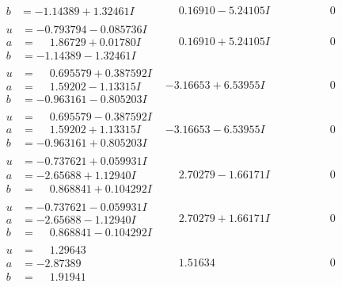 \documentclass[1p]{elsarticle_modified}
\theoremstyle{definition}
\begin{document}
$$\begin{array}{c|c|c}
\begin{aligned}
b &= -1.14389 + 1.32461 I\end{aligned}
 & \phantom{-}0.16910 - 5.24105 I & \phantom{-0.000000 } 0 \\ \hline\begin{aligned}
u &= -0.793794 - 0.085736 I \\
a &= \phantom{-}1.86729 + 0.01780 I \\
b &= -1.14389 - 1.32461 I\end{aligned}
 & \phantom{-}0.16910 + 5.24105 I & \phantom{-0.000000 } 0 \\ \hline\begin{aligned}
u &= \phantom{-}0.695579 + 0.387592 I \\
a &= \phantom{-}1.59202 - 1.13315 I \\
b &= -0.963161 - 0.805203 I\end{aligned}
 & -3.16653 + 6.53955 I & \phantom{-0.000000 } 0 \\ \hline\begin{aligned}
u &= \phantom{-}0.695579 - 0.387592 I \\
a &= \phantom{-}1.59202 + 1.13315 I \\
b &= -0.963161 + 0.805203 I\end{aligned}
 & -3.16653 - 6.53955 I & \phantom{-0.000000 } 0 \\ \hline\begin{aligned}
u &= -0.737621 + 0.059931 I \\
a &= -2.65688 + 1.12940 I \\
b &= \phantom{-}0.868841 + 0.104292 I\end{aligned}
 & \phantom{-}2.70279 - 1.66171 I & \phantom{-0.000000 } 0 \\ \hline\begin{aligned}
u &= -0.737621 - 0.059931 I \\
a &= -2.65688 - 1.12940 I \\
b &= \phantom{-}0.868841 - 0.104292 I\end{aligned}
 & \phantom{-}2.70279 + 1.66171 I & \phantom{-0.000000 } 0 \\ \hline\begin{aligned}
u &= \phantom{-}1.29643\phantom{ +0.000000I} \\
a &= -2.87389\phantom{ +0.000000I} \\
b &= \phantom{-}1.91941\phantom{ +0.000000I}\end{aligned}
 & \phantom{-}1.51634\phantom{ +0.000000I} & \phantom{-0.000000 } 0 \\ \hline\begin{aligned}

\end{aligned}
\end{array}$$
\end{document}
